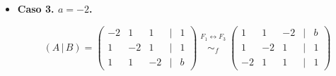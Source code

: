 \documentclass[a4paper,12pt]{article}
\begin{document}
\begin{ejercicio}[title=Ejercicio 31]
\begin{itemize}
\[
\operatorname{Rg}(A)=\text{nº filas no nulas}=1,
\qquad
\operatorname{Rg}(A\,|\,B)=
\begin{cases}
1 & \text{si } b=1,\\[2mm]
2 & \text{si } b\neq 1.
\end{cases}
\]

\begin{itemize}
\item \textbf{Subcaso 2.1. $a=1$ y $b=1$.}
\[
(A\,|\,B)\sim_f
\begin{pmatrix}
1 & 1 & 1 &\Big|& 1\\
0 & 0 & 0 &\Big|& 0\\
0 & 0 & 0 &\Big|& 0
\end{pmatrix}
\text{ está en forma escalonada por filas.}
\]

Se tiene:
\[
\operatorname{Rg}(A)=\operatorname{Rg}(A\,|\,B)=1 \neq \text{nº incógnitas}=3.
\]
\[
\boxed{\text{El sistema es un SCI si } a=1 \text{ y } b=1.}
\]

Resolvemos:
\[
\begin{cases}
    x+y+z=1
\end{cases}
\]

Tomamos \(y=\lambda_1\), \(z=\lambda_2\) parámetros libres. Entonces:
\[
x=1-\lambda_1-\lambda_2.
\]
\[
\boxed{
x = 1-\lambda_1-\lambda_2,\qquad
y=\lambda_1,\qquad
z=\lambda_2,\qquad
\lambda_1,\lambda_2\in\mathbb{R}.
}
\]

\vspace{0.5em}

\item \textbf{Subcaso 2.2. $a=1$ y $b\neq 1$.}

En este caso:
\[
\operatorname{Rg}(A)=1 \neq \operatorname{Rg}(A\,|\,B)=2.
\]
\[
\boxed{\text{El sistema es un SI si } a=1 \text{ y } b\neq 1.}
\]

\end{itemize}

\item \textbf{Caso 3. \(a=-2\).}

\[
(A\,|\,B)=
\begin{pmatrix}
-2 & 1 & 1 &\Big|& 1\\
1 & -2 & 1 &\Big|& 1\\
1 & 1 & -2 &\Big|& b
\end{pmatrix}
\overset{\substack{F_1 \leftrightarrow F_3\\{}}}{\sim_f}
\begin{pmatrix}
1 & 1 & -2 &\Big|& b\\
1 & -2 & 1 &\Big|& 1\\
-2 & 1 & 1 &\Big|& 1
\end{pmatrix}
\]


\end{itemize}
\end{ejercicio}
\end{document}
